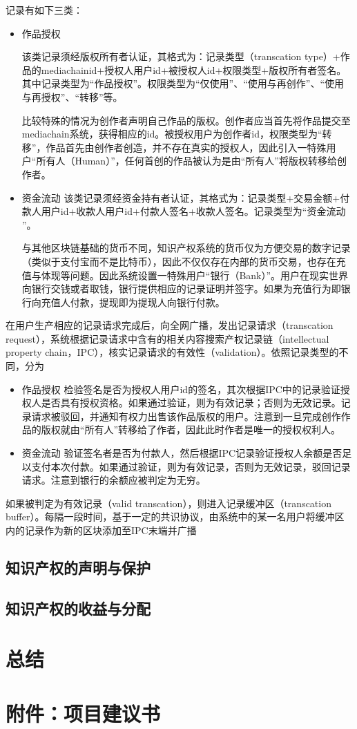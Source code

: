 \documentclass[withoutpreface,bwprint]{cumcmthesis} %
\begin{document}
记录有如下三类：
\begin{itemize}
\item{作品授权}

该类记录须经版权所有者认证，其格式为：记录类型（transcation type）+作品的mediachainid+授权人用户id+被授权人id+权限类型+版权所有者签名。其中记录类型为“作品授权”。权限类型为“仅使用”、“使用与再创作”、“使用与再授权”、“转移”等。

比较特殊的情况为创作者声明自己作品的版权。创作者应当首先将作品提交至mediachain系统，获得相应的id。被授权用户为创作者id，权限类型为“转移”，作品首先由创作者创造，并不存在真实的授权人，因此引入一特殊用户“所有人（Human）”，任何首创的作品被认为是由“所有人”将版权转移给创作者。

\item{资金流动}
该类记录须经资金持有者认证，其格式为：记录类型+交易金额+付款人用户id+收款人用户id+付款人签名+收款人签名。记录类型为“资金流动 ”。

与其他区块链基础的货币不同，知识产权系统的货币仅为方便交易的数字记录（类似于支付宝而不是比特币），因此不仅仅存在内部的货币交易，也存在充值与体现等问题。因此系统设置一特殊用户“银行（Bank）”。用户在现实世界向银行交钱或者取钱，银行提供相应的记录证明并签字。如果为充值行为即银行向充值人付款，提现即为提现人向银行付款。
\end{itemize}

在用户生产相应的记录请求完成后，向全网广播，发出记录请求（transcation request），系统根据记录请求中含有的相关内容搜索产权记录链（intellectual property chain，IPC），核实记录请求的有效性（validation）。依照记录类型的不同，分为

\begin{itemize}
	\item{作品授权}
	检验签名是否为授权人用户id的签名，其次根据IPC中的记录验证授权人是否具有授权资格。如果通过验证，则为有效记录；否则为无效记录。记录请求被驳回，并通知有权力出售该作品版权的用户。注意到一旦完成创作作品的版权就由“所有人”转移给了作者，因此此时作者是唯一的授权权利人。
	\item{资金流动}
	验证签名者是否为付款人，然后根据IPC记录验证授权人余额是否足以支付本次付款。如果通过验证，则为有效记录，否则为无效记录，驳回记录请求。注意到银行的余额应被判定为无穷。
\end{itemize}

如果被判定为有效记录（valid transcation），则进入记录缓冲区（transcation buffer）。每隔一段时间，基于一定的共识协议，由系统中的某一名用户将缓冲区内的记录作为新的区块添加至IPC末端并广播




\subsection{知识产权的声明与保护}

\subsection{知识产权的收益与分配}

\section{总结}

\section*{附件：项目建议书}
\end{document}
